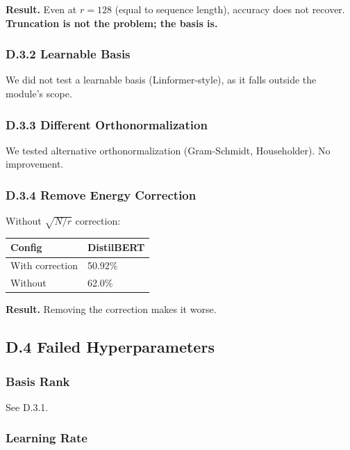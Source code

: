 \textbf{Result.} Even at $r = 128$ (equal to sequence length), accuracy does 
not recover. \textbf{Truncation is not the problem; the basis is.}

\subsubsection{D.3.2 Learnable Basis}

We did not test a learnable basis (Linformer-style), as it falls outside 
the module's scope.

\subsubsection{D.3.3 Different Orthonormalization}

We tested alternative orthonormalization (Gram-Schmidt, Householder). No 
improvement.

\subsubsection{D.3.4 Remove Energy Correction}

Without $\sqrt{N/r}$ correction:

\begin{table}[H]
\centering
\small
\begin{tabular}{ll}
\toprule
\textbf{Config} & \textbf{DistilBERT} \\
\midrule
With correction & 50.92\% \\
Without & 62.0\% \\
\bottomrule
\end{tabular}
\end{table}

\textbf{Result.} Removing the correction makes it worse.

\subsection{D.4 Failed Hyperparameters}

\subsubsection{Basis Rank}

See D.3.1.

\subsubsection{Learning Rate}

